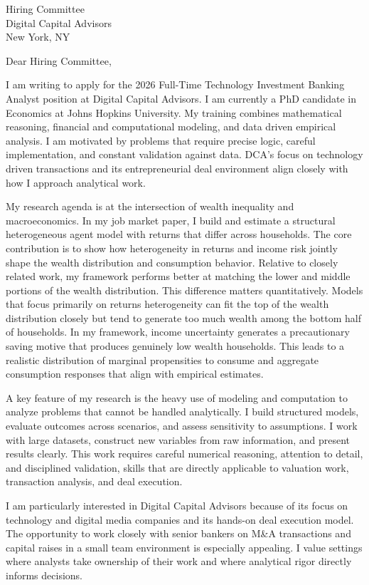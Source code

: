 \documentclass[11pt]{letter}
\begin{document}
\begin{letter}{Hiring Committee \\ Digital Capital Advisors \\ New York, NY}

\opening{Dear Hiring Committee,}

I am writing to apply for the 2026 Full-Time Technology Investment Banking Analyst position at Digital Capital Advisors. I am currently a PhD candidate in Economics at Johns Hopkins University. My training combines mathematical reasoning, financial and computational modeling, and data driven empirical analysis. I am motivated by problems that require precise logic, careful implementation, and constant validation against data. DCA’s focus on technology driven transactions and its entrepreneurial deal environment align closely with how I approach analytical work.

My research agenda is at the intersection of wealth inequality and macroeconomics. In my job market paper, I build and estimate a structural heterogeneous agent model with returns that differ across households. The core contribution is to show how heterogeneity in returns and income risk jointly shape the wealth distribution and consumption behavior. Relative to closely related work, my framework performs better at matching the lower and middle portions of the wealth distribution. This difference matters quantitatively. Models that focus primarily on returns heterogeneity can fit the top of the wealth distribution closely but tend to generate too much wealth among the bottom half of households. In my framework, income uncertainty generates a precautionary saving motive that produces genuinely low wealth households. This leads to a realistic distribution of marginal propensities to consume and aggregate consumption responses that align with empirical estimates.

A key feature of my research is the heavy use of modeling and computation to analyze problems that cannot be handled analytically. I build structured models, evaluate outcomes across scenarios, and assess sensitivity to assumptions. I work with large datasets, construct new variables from raw information, and present results clearly. This work requires careful numerical reasoning, attention to detail, and disciplined validation, skills that are directly applicable to valuation work, transaction analysis, and deal execution.

I am particularly interested in Digital Capital Advisors because of its focus on technology and digital media companies and its hands-on deal execution model. The opportunity to work closely with senior bankers on M\&A transactions and capital raises in a small team environment is especially appealing. I value settings where analysts take ownership of their work and where analytical rigor directly informs decisions.


\end{letter}
\end{document}
